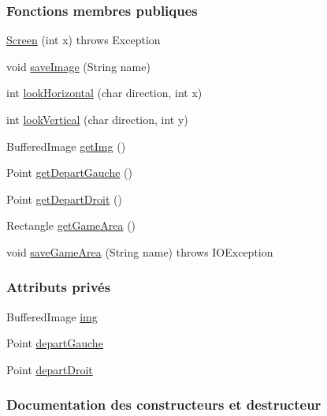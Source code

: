\subsubsection*{Fonctions membres publiques}
\begin{DoxyCompactItemize}
\item 
\hyperlink{classSushis_1_1src_1_1Screen_a258f7eb01d8f0fd7c80b71ef1047844f}{Screen} (int x)  throws Exception 
\item 
void \hyperlink{classSushis_1_1src_1_1Screen_af948ccc9c11bff6096c16948282b7c38}{save\+Image} (String name)
\item 
int \hyperlink{classSushis_1_1src_1_1Screen_a7bc3c054b8e0ec14d97867a4c483ea14}{look\+Horizontal} (char direction, int x)
\item 
int \hyperlink{classSushis_1_1src_1_1Screen_a01405ce31969ab29a1e90837a0f6aa99}{look\+Vertical} (char direction, int y)
\item 
Buffered\+Image \hyperlink{classSushis_1_1src_1_1Screen_a7b1464431f964c97aecde1cfb24b1e6b}{get\+Img} ()
\item 
Point \hyperlink{classSushis_1_1src_1_1Screen_aa5b92d373dd7036de8649d07716b61f3}{get\+Depart\+Gauche} ()
\item 
Point \hyperlink{classSushis_1_1src_1_1Screen_acb2731f621dac7bae53b0526c46406b4}{get\+Depart\+Droit} ()
\item 
Rectangle \hyperlink{classSushis_1_1src_1_1Screen_a99362a61a6bd00cab64215d29fbe94da}{get\+Game\+Area} ()
\item 
void \hyperlink{classSushis_1_1src_1_1Screen_a115f4479997dc3724444575577efa56c}{save\+Game\+Area} (String name)  throws I\+O\+Exception 
\end{DoxyCompactItemize}
\subsubsection*{Attributs privés}
\begin{DoxyCompactItemize}
\item 
Buffered\+Image \hyperlink{classSushis_1_1src_1_1Screen_ae3beed4f3d5e1570d216d186f7dee4a7}{img}
\item 
Point \hyperlink{classSushis_1_1src_1_1Screen_a9b2270f51a183da24cf6f89d05a46991}{depart\+Gauche}
\item 
Point \hyperlink{classSushis_1_1src_1_1Screen_a47ce555aa58251254ba6d5b76b857ab7}{depart\+Droit}
\end{DoxyCompactItemize}


\subsubsection{Documentation des constructeurs et destructeur}
\hypertarget{classSushis_1_1src_1_1Screen_a258f7eb01d8f0fd7c80b71ef1047844f}{}
